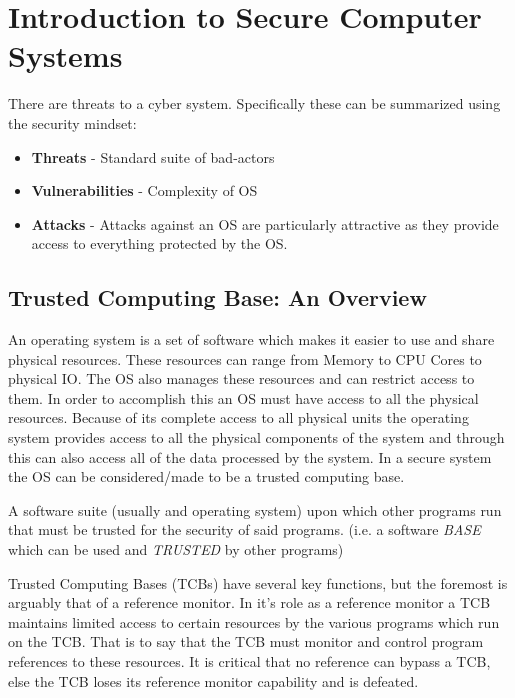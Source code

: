 
\graphicspath{ {./chapters/Secure_Computer_Systems} }

\section{Introduction to Secure Computer Systems}
\label{sec:intro_to_secure_comp_systems}
  There are threats to a cyber system. 
  Specifically these can be summarized using the security mindset:
  \begin{itemize}
    \item \textbf{Threats} - Standard suite of bad-actors
    \item \textbf{Vulnerabilities} - Complexity of OS
    \item \textbf{Attacks} - Attacks against an OS are particularly attractive as they provide access to everything protected by the OS.
  \end{itemize}

  \subsection{Trusted Computing Base: An Overview}
  \label{ssec:tcb_overview}

    An operating system is a set of software which makes it easier to use and share physical resources.
    These resources can range from Memory to CPU Cores to physical IO.
    The OS also manages these resources and can restrict access to them.
    In order to accomplish this an OS must have access to all the physical resources.
    Because of its complete access to all physical units the operating system provides access to all
      the physical components of the system and through this can also access all of the data processed by
      the system.
    In a secure system the OS can be considered/made to be a trusted computing base.

    \begin{defbox}
      A software suite (usually and operating system) upon which other programs
        run that must be trusted for the security of said programs.
      (i.e. a software \textit{BASE} which can be used and \textit{TRUSTED} by other programs)
    \end{defbox}

    Trusted Computing Bases (TCBs) have several key functions, but the foremost is arguably that of
      a reference monitor.
    In it's role as a reference monitor a TCB maintains limited access to certain resources by the various programs
      which run on the TCB.
    That is to say that the TCB must monitor and control program references to these resources.
    It is critical that no reference can bypass a TCB, else the TCB loses its reference monitor capability and 
      is defeated.

